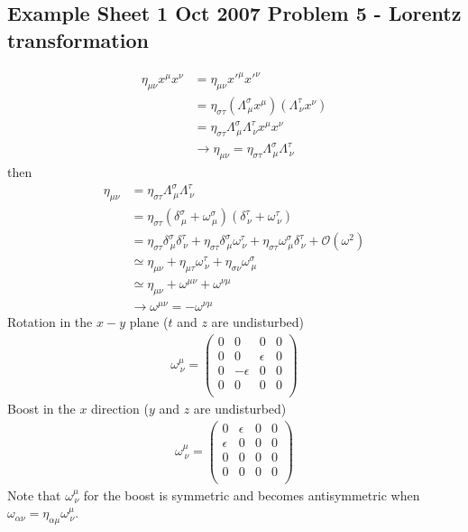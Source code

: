 \documentclass[../main.tex]{subfiles}
\begin{document}
\subsection{Example Sheet 1 Oct 2007 Problem 5 - Lorentz transformation}
\begin{align}
\eta_{\mu\nu}x^\mu x^\nu
&=\eta_{\mu\nu}x'^\mu x'^\nu\\
&=\eta_{\sigma\tau}(\Lambda^\sigma_{\,\mu}x^\mu)(\Lambda^\tau_{\,\nu}x^\nu)\\
&=\eta_{\sigma\tau}\Lambda^\sigma_{\,\mu}\Lambda^\tau_{\,\nu}x^\mu x^\nu\\
&\rightarrow \eta_{\mu\nu}=\eta_{\sigma\tau}\Lambda^\sigma_{\,\mu}\Lambda^\tau_{\,\nu}
\end{align}
then
\begin{align}
\eta_{\mu\nu}
&=\eta_{\sigma\tau}\Lambda^\sigma_{\,\mu}\Lambda^\tau_{\,\nu}\\
&=\eta_{\sigma\tau}(\delta^\sigma_{\,\mu}+\omega^\sigma_{\,\mu})(\delta^\tau_{\,\nu}+\omega^\tau_{\,\nu})\\
&=\eta_{\sigma\tau}\delta^\sigma_{\,\mu}\delta^\tau_{\,\nu}
+\eta_{\sigma\tau}\delta^\sigma_{\,\mu}\omega^\tau_{\,\nu}
+\eta_{\sigma\tau}\omega^\sigma_{\,\mu}\delta^\tau_{\,\nu}+\mathcal{O}(\omega^2)\\
&\simeq\eta_{\mu\nu}+\eta_{\mu\tau}\omega^\tau_{\,\nu}+\eta_{\sigma\nu}\omega^\sigma_{\,\mu}\\
&\simeq\eta_{\mu\nu}+\omega^{\mu\nu}+\omega^{\nu\mu}\\
&\rightarrow\omega^{\mu\nu}=-\omega^{\nu\mu}
\end{align}
Rotation in the $x-y$ plane ($t$ and $z$ are undisturbed)
\begin{align}
\omega^\mu_{\,\nu}=
\left(
\begin{matrix}
0 & 0 & 0 & 0\\
0 & 0 & \epsilon & 0\\
0 & -\epsilon & 0 & 0\\
0 & 0 & 0 & 0\\
\end{matrix}
\right)
\end{align}
Boost in the $x$ direction ($y$ and $z$ are undisturbed)
\begin{align}
\omega^\mu_{\,\nu}=
\left(
\begin{matrix}
0 & \epsilon & 0 & 0\\
\epsilon & 0 & 0 & 0\\
0 & 0 & 0 & 0\\
0 & 0 & 0 & 0\\
\end{matrix}
\right)
\end{align}
Note that $\omega^\mu_{\,\nu}$ for the boost is symmetric and becomes antisymmetric when $\omega_{\alpha\nu}=\eta_{\alpha\mu}\omega^\mu_{\,\nu}$.
\end{document}
